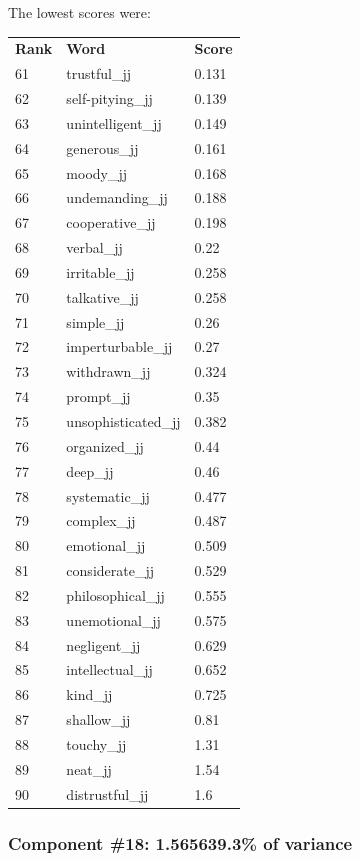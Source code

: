 \documentclass[10pt,letterpaper]{book}
\begin{document}
The lowest scores were:
\begin{tabular}{ l l l }
        \textbf{Rank} & \textbf{Word} & \textbf{Score} \\
        61 & trustful\_jj & 0.131 \\
        62 & self-pitying\_jj & 0.139 \\
        63 & unintelligent\_jj & 0.149 \\
        64 & generous\_jj & 0.161 \\
        65 & moody\_jj & 0.168 \\
        66 & undemanding\_jj & 0.188 \\
        67 & cooperative\_jj & 0.198 \\
        68 & verbal\_jj & 0.22 \\
        69 & irritable\_jj & 0.258 \\
        70 & talkative\_jj & 0.258 \\
        71 & simple\_jj & 0.26 \\
        72 & imperturbable\_jj & 0.27 \\
        73 & withdrawn\_jj & 0.324 \\
        74 & prompt\_jj & 0.35 \\
        75 & unsophisticated\_jj & 0.382 \\
        76 & organized\_jj & 0.44 \\
        77 & deep\_jj & 0.46 \\
        78 & systematic\_jj & 0.477 \\
        79 & complex\_jj & 0.487 \\
        80 & emotional\_jj & 0.509 \\
        81 & considerate\_jj & 0.529 \\
        82 & philosophical\_jj & 0.555 \\
        83 & unemotional\_jj & 0.575 \\
        84 & negligent\_jj & 0.629 \\
        85 & intellectual\_jj & 0.652 \\
        86 & kind\_jj & 0.725 \\
        87 & shallow\_jj & 0.81 \\
        88 & touchy\_jj & 1.31 \\
        89 & neat\_jj & 1.54 \\
        90 & distrustful\_jj & 1.6 \\
\end{tabular}
\subsubsection{Component \#18: 1.565639.3\% of variance}
\end{document}
